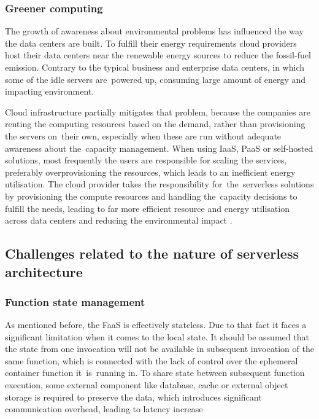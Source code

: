 \subsubsection{Greener computing}

The growth of awareness about environmental problems has influenced the way the data centers are built. To fulfill their energy requirements cloud providers host their data centers near the renewable energy sources to reduce the fossil-fuel emission. Contrary to the typical business and enterprise data centers, in which some of the idle servers are~powered up, consuming large amount of energy and impacting environment.

Cloud infrastructure partially mitigates that problem, because the companies are renting the computing resources based on the demand, rather than provisioning the servers on~their own, especially when these are run without adequate awareness about the~capacity management. When using IaaS, PaaS or self-hosted solutions, most frequently the users are responsible for scaling the services, preferably overprovisioning the resources, which leads to an inefficient energy utilisation. The cloud provider takes the responsibility for~the~serverless solutions by provisioning the compute resources and handling the~capacity decisions to fulfill the needs, leading to far more efficient resource and energy utilisation across data centers and reducing the environmental impact \cite{MartinFowlerServerless}.

\subsection{Challenges related to the nature of serverless architecture} \label{chapter:serverless-challenges-related-to-the-nature-of-serverless-architecture}

\subsubsection{Function state management}

As mentioned before, the FaaS is effectively stateless. Due to that fact it faces a significant limitation when it comes to the local state. It should be assumed that the state from one invocation will not be available in subsequent invocation of the same function, which is connected with the lack of control over the ephemeral container function it~is~running in. To share state between subsequent function execution, some external component like database, cache or external object storage is required to preserve the data, which introduces significant communication overhead, leading to latency increase \cite{MartinFowlerServerless}

